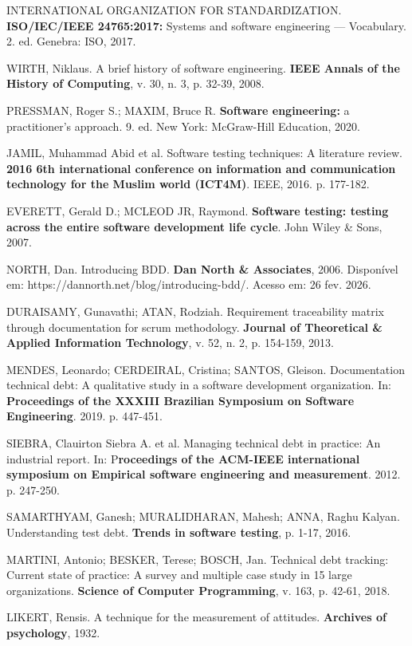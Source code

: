 INTERNATIONAL ORGANIZATION FOR STANDARDIZATION. \textbf{ISO/IEC/IEEE 24765:2017:} Systems and software engineering — Vocabulary. 2. ed. Genebra: ISO, 2017.

WIRTH, Niklaus. A brief history of software engineering. \textbf{IEEE Annals of the History of Computing}, v. 30, n. 3, p. 32-39, 2008.

PRESSMAN, Roger S.; MAXIM, Bruce R. \textbf{Software engineering:} a practitioner's approach. 9. ed. New York: McGraw-Hill Education, 2020.

JAMIL, Muhammad Abid et al. Software testing techniques: A literature review. \textbf{2016 6th international conference on information and communication technology for the Muslim world (ICT4M)}. IEEE, 2016. p. 177-182.

EVERETT, Gerald D.; MCLEOD JR, Raymond. \textbf{Software testing: testing across the entire software development life cycle}. John Wiley \& Sons, 2007.

NORTH, Dan. Introducing BDD. \textbf{Dan North \& Associates}, 2006. Disponível em: https://dannorth.net/blog/introducing-bdd/. Acesso em: 26 fev. 2026.

DURAISAMY, Gunavathi; ATAN, Rodziah. Requirement traceability matrix through documentation for scrum methodology. \textbf{Journal of Theoretical \& Applied Information Technology}, v. 52, n. 2, p. 154-159, 2013.

MENDES, Leonardo; CERDEIRAL, Cristina; SANTOS, Gleison. Documentation technical debt: A qualitative study in a software development organization. In: \textbf{Proceedings of the XXXIII Brazilian Symposium on Software Engineering}. 2019. p. 447-451.

SIEBRA, Clauirton Siebra A. et al. Managing technical debt in practice: An industrial report. In: P\textbf{roceedings of the ACM-IEEE international symposium on Empirical software engineering and measurement}. 2012. p. 247-250.

SAMARTHYAM, Ganesh; MURALIDHARAN, Mahesh; ANNA, Raghu Kalyan. Understanding test debt. \textbf{Trends in software testing}, p. 1-17, 2016.

MARTINI, Antonio; BESKER, Terese; BOSCH, Jan. Technical debt tracking: Current state of practice: A survey and multiple case study in 15 large organizations. \textbf{Science of Computer Programming}, v. 163, p. 42-61, 2018.

LIKERT, Rensis. A technique for the measurement of attitudes. \textbf{Archives of psychology}, 1932.